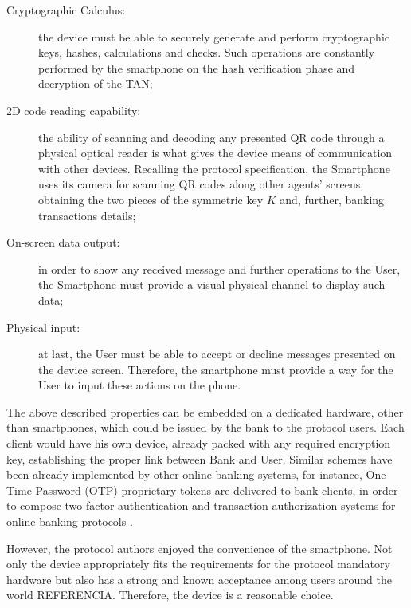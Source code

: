 \begin{description}
  \item[Cryptographic Calculus:] the device must be able to securely generate and perform cryptographic keys, hashes, calculations and checks. Such operations are constantly performed by the smartphone on the hash verification phase and decryption of the TAN;

  \item[2D code reading capability:] the ability of scanning and decoding any presented QR code through a physical optical reader is what gives the device means of communication with other devices. Recalling the protocol specification, the Smartphone uses its camera for scanning QR codes along other agents' screens, obtaining the two pieces of the symmetric key $K$ and, further, banking transactions details;

  \item[On-screen data output:] in order to show any received message and further operations to the User, the Smartphone must provide a visual physical channel to display such data;

  \item[Physical input:] at last, the User must be able to accept or decline messages presented on the device screen. Therefore, the smartphone must provide a way for the User to input these actions on the phone.
\end{description}

The above described properties can be embedded on a dedicated hardware, other than smartphones, which could be issued by the bank to the protocol users. Each client would have his own device, already packed with any required encryption key, establishing the proper link between Bank and User. Similar schemes have been already implemented by other online banking systems, for instance, One Time Password (OTP) proprietary tokens are delivered to bank clients, in order to compose two-factor authentication and transaction authorization systems for online banking protocols \cite{Bonneau2012, Claessens2002}.

However, the protocol authors enjoyed the convenience of the smartphone. Not only the device appropriately fits the requirements for the protocol mandatory hardware but also has a strong and known acceptance among users around the world {\color{blue} REFERENCIA}. Therefore, the device is a reasonable choice.



